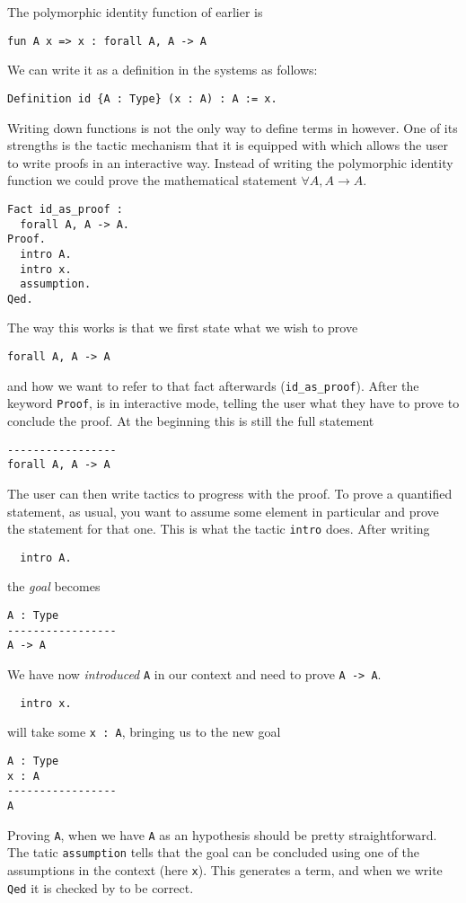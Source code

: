 The polymorphic identity function of earlier is
\begin{verbatim}
fun A x => x : forall A, A -> A
\end{verbatim}
We can write it as a definition in the systems as follows:
\begin{verbatim}
Definition id {A : Type} (x : A) : A := x.
\end{verbatim}

Writing down functions is not the only way to define terms in \Coq however.
One of its strengths is the tactic mechanism that it is equipped with which
allows the user to write proofs in an interactive way.
Instead of writing the polymorphic identity function we could prove the
mathematical statement \(\forall A, A \to A\).
\begin{verbatim}
Fact id_as_proof :
  forall A, A -> A.
Proof.
  intro A.
  intro x.
  assumption.
Qed.
\end{verbatim}
The way this works is that we first state what we wish to prove
\begin{verbatim}
forall A, A -> A
\end{verbatim}
and how we want to refer to that fact afterwards
(\texttt{id_as_proof}).
After the keyword \texttt{Proof}, \Coq is in interactive mode,
telling the user what they have to prove to conclude the proof.
At the beginning this is still the full statement
\begin{verbatim}
-----------------
forall A, A -> A
\end{verbatim}
The user can then write tactics to progress with the proof. To prove a
quantified statement, as usual, you want to assume some element in particular
and prove the statement for that one. This is what the tactic
\texttt{intro} does.
After writing
\begin{verbatim}
  intro A.
\end{verbatim}
the \emph{goal} becomes
\begin{verbatim}
A : Type
-----------------
A -> A
\end{verbatim}
We have now \emph{introduced} \texttt{A} in our context and need to
prove \texttt{A -> A}.
\begin{verbatim}
  intro x.
\end{verbatim}
will take some \texttt{x : A}, bringing us to the new goal
\begin{verbatim}
A : Type
x : A
-----------------
A
\end{verbatim}
Proving \texttt{A}, when we have \texttt{A} as an hypothesis
should be pretty straightforward. The tatic \texttt{assumption}
tells \Coq that the goal can be concluded using one of the assumptions in the
context (here \texttt{x}).
This generates a term, and when we write \texttt{Qed} it is checked
by \Coq to be correct.

